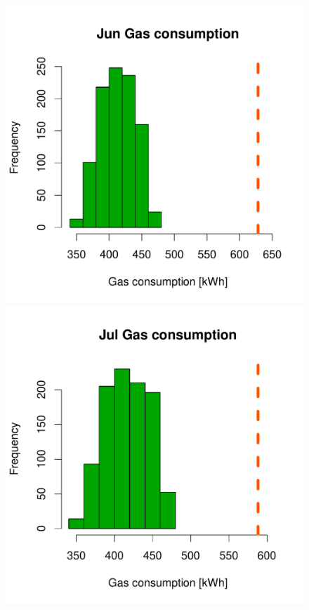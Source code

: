 \documentclass[a4paper, 12pt]{article}
\begin{document}
\begin{figure}
 \includegraphics[width=\scale]{Simulation_histograms/Batch_2_Only/Gas_Runs/Jun_Gas}\\
 \includegraphics[width=\scale]{Simulation_histograms/Batch_2_Only/Gas_Runs/Jul_Gas}

\end{figure}
\end{document}
